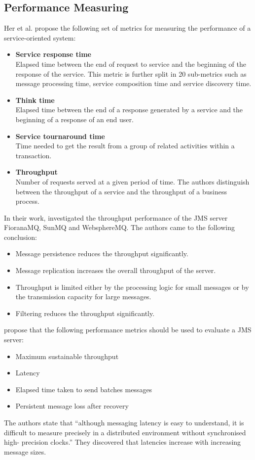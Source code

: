 \subsection{Performance Measuring}
Her et al. \citep{Her:2007qf} propose the following set of metrics for measuring the performance of a service-oriented system:
\begin{itemize}
	\item \textbf{Service response time}\\
	Elapsed time between the end of request to service and the beginning of the response of the service. This metric is further split in 20 sub-metrics such as message processing time, service composition time and service discovery time.
	\item \textbf{Think time}\\
	Elapsed time between the end of a response generated by a service and the beginning of a response of an end user.
	\item \textbf{Service tournaround time}\\
	Time needed to get the result from a group of related activities within a transaction.
	\item \textbf{Throughput}\\
	Number of requests served at a given period of time. The authors distinguish between the throughput of a service and the throughput of a business process.
\end{itemize}

In their work, \cite{Henjes:2006nx}\cite{Menth:2006ys} investigated the throughput performance of the JMS server FioranaMQ, SunMQ and WebsphereMQ. The authors came to the following conclusion:
\begin{itemize}
	\item Message persistence reduces the throughput significantly.
	\item Message replication increases the overall throughput of the server.
	\item Throughput is limited either by the processing logic for small messages or by the transmission capacity for large messages.
	\item Filtering reduces the throughput significantly.
\end{itemize}

\cite{Chen:2004cr} propose that the following performance metrics should be used to evaluate a JMS server:
\begin{itemize}
	\item Maximum sustainable throughput
	\item Latency
	\item Elapsed time taken to send batches messages
	\item Persistent message loss after recovery
\end{itemize}
The authors state that ``although messaging latency is easy to understand, it is difficult to measure precisely in a distributed environment without synchronised high- precision clocks.'' They discovered that latencies increase with increasing message sizes.

